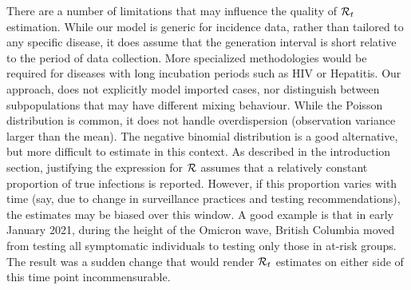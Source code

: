 
There are a number of limitations that may influence the quality of
$\mathcal{R}_t$ estimation.
While our model is
generic for incidence data, rather than tailored to any specific disease,
it does assume that the generation interval is short relative to the
period of data collection. More specialized methodologies would be required for
diseases with long incubation periods such as HIV or Hepatitis. 
Our approach, does not explicitly model imported cases, nor distinguish between
subpopulations that may have different mixing behaviour. 
While the Poisson distribution is common, it does not handle overdispersion
(observation variance larger than the mean). The negative binomial distribution
is a good alternative, but more difficult to estimate in this context.
As described in the introduction section, justifying the expression for $\mathcal{R}$ assumes
that a relatively constant proportion of true infections is reported. However,
if this proportion varies with time (say, due to change in surveillance
practices and testing recommendations), the estimates may be biased over this
window. A good example is that in early January 2021, during the height of the
Omicron wave, British Columbia moved from testing all symptomatic individuals to
testing only those in at-risk groups. The result was a sudden change that would
render $\mathcal{R}_t$ estimates on either side of this time point incommensurable.

